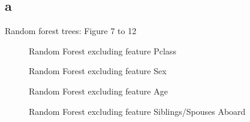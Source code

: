 \documentclass{article}
\begin{document}
\subsection{a}
Random forest trees: Figure 7 to 12
\begin{figure}
    \caption{Random Forest excluding feature Pclass}
\end{figure}
\begin{figure}
    \caption{Random Forest excluding feature Sex}
\end{figure}
\begin{figure}
    \caption{Random Forest excluding feature Age}
\end{figure}
\begin{figure}
    \caption{Random Forest excluding feature Siblings/Spouses Aboard}
\end{figure}
\end{document}
